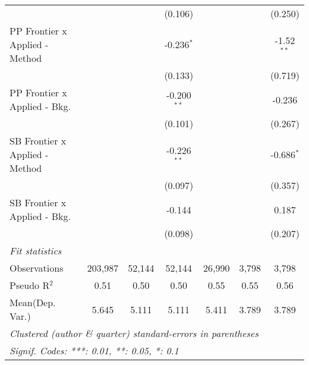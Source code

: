 \begin{tabular}{lcccccc}
                                  &                &                & (0.106)        &               &         & (0.250)\\   
   PP Frontier x Applied - Method &                &                & -0.236$^{*}$   &               &         & -1.52$^{**}$\\   
                                  &                &                & (0.133)        &               &         & (0.719)\\   
   PP Frontier x Applied - Bkg.   &                &                & -0.200$^{**}$  &               &         & -0.236\\   
                                  &                &                & (0.101)        &               &         & (0.267)\\   
   SB Frontier x Applied - Method &                &                & -0.226$^{**}$  &               &         & -0.686$^{*}$\\   
                                  &                &                & (0.097)        &               &         & (0.357)\\   
   SB Frontier x Applied - Bkg.   &                &                & -0.144         &               &         & 0.187\\   
                                  &                &                & (0.098)        &               &         & (0.207)\\   
   \midrule
   \emph{Fit statistics}\\
   Observations                   & 203,987        & 52,144         & 52,144         & 26,990        & 3,798   & 3,798\\  
   Pseudo R$^2$                   & 0.51           & 0.50           & 0.50           & 0.55          & 0.55    & 0.56\\  
Mean(Dep. Var.) & 5.645 & 5.111 & 5.111 & 5.411 & 3.789 & 3.789 \\
   \midrule \midrule
   \multicolumn{7}{l}{\emph{Clustered (author \& quarter) standard-errors in parentheses}}\\
   \multicolumn{7}{l}{\emph{Signif. Codes: ***: 0.01, **: 0.05, *: 0.1}}\\
\end{tabular}
\par\endgroup
